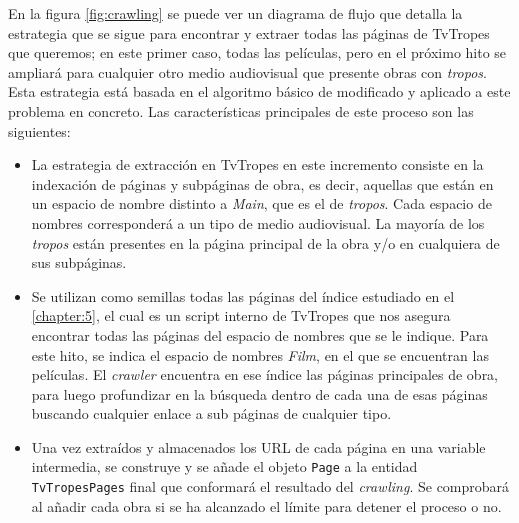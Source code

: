 En la figura \ref{fig:crawling} se puede ver un diagrama de flujo que detalla la
estrategia que se sigue para encontrar y extraer todas las páginas de
TvTropes que queremos; en este primer caso, todas las películas, pero en el próximo hito se
ampliará para cualquier otro medio audiovisual que presente obras con
\textit{tropos}. Esta estrategia está basada en el algoritmo básico de
\cite{olston2010web} modificado y aplicado a este problema en concreto. Las
características principales de este proceso son las siguientes:
\begin{itemize}
    \item La estrategia de extracción en TvTropes en este incremento consiste en
    la indexación de páginas y subpáginas de obra, es decir, aquellas que están
    en un espacio de nombre distinto a \textit{Main}, que es el de
    \textit{tropos}. Cada espacio de nombres corresponderá a un tipo de medio
    audiovisual. La mayoría de los \textit{tropos} están presentes en la página
    principal de la obra y/o en cualquiera de sus subpáginas.
    \item Se utilizan como semillas todas las páginas del índice estudiado en el
    \autoref{chapter:5}, el cual es un script interno de TvTropes que nos
    asegura encontrar todas las páginas del espacio de nombres que se le
    indique. Para este hito, se indica el espacio de nombres \textit{Film}, en
    el que se encuentran las películas. El \textit{crawler} encuentra en ese
    índice las páginas principales de obra, para luego profundizar en la
    búsqueda dentro de cada una de esas páginas buscando cualquier enlace a sub
    páginas de cualquier tipo.
    \item Una vez extraídos y almacenados los URL de cada página en una
    variable intermedia, se construye y se añade el objeto \texttt{Page} a
    la entidad \texttt{TvTropesPages} final que conformará el resultado del
    \textit{crawling}. Se comprobará al añadir cada obra si se ha alcanzado el
    límite para detener el proceso o no.
\end{itemize}

